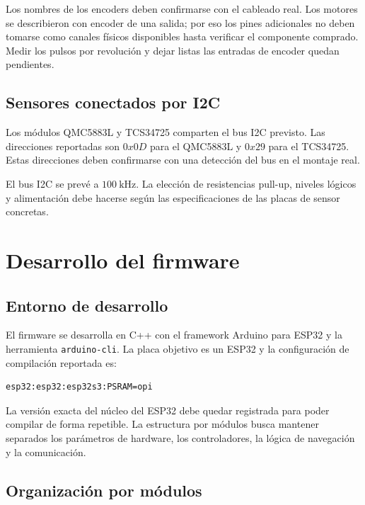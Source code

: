 \documentclass[journal]{IEEEtran}
\begin{document}
Los nombres de los encoders deben confirmarse con el cableado real. Los motores se describieron con encoder de una salida; por eso los pines adicionales no deben tomarse como canales físicos disponibles hasta verificar el componente comprado. Medir los pulsos por revolución y dejar listas las entradas de encoder quedan pendientes.

\subsection{Sensores conectados por I2C}

Los módulos QMC5883L y TCS34725 comparten el bus I2C previsto. Las direcciones reportadas son $0x0D$ para el QMC5883L y $0x29$ para el TCS34725. Estas direcciones deben confirmarse con una detección del bus en el montaje real.

El bus I2C se prevé a $100~\mathrm{kHz}$. La elección de resistencias pull-up, niveles lógicos y alimentación debe hacerse según las especificaciones de las placas de sensor concretas.


\section{Desarrollo del firmware}

\subsection{Entorno de desarrollo}

El firmware se desarrolla en C++ con el framework Arduino para ESP32 y la herramienta \texttt{arduino-cli}. La placa objetivo es un ESP32 y la configuración de compilación reportada es:

\begin{lstlisting}[basicstyle=\ttfamily\scriptsize,breaklines=true]
esp32:esp32:esp32s3:PSRAM=opi
\end{lstlisting}

La versión exacta del núcleo del ESP32 debe quedar registrada para poder compilar de forma repetible. La estructura por módulos busca mantener separados los parámetros de hardware, los controladores, la lógica de navegación y la comunicación.

\subsection{Organización por módulos}
\end{document}
